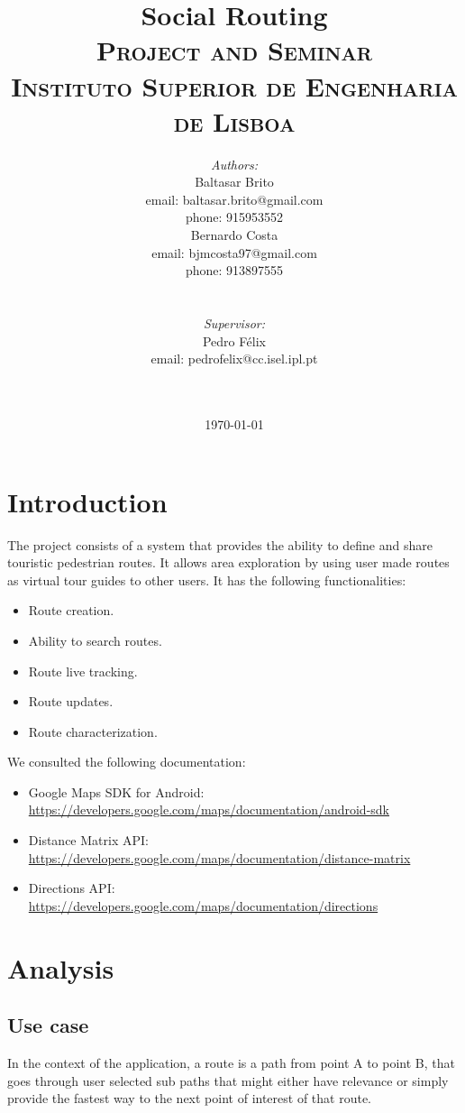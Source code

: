 \documentclass{article}
\title{
    \vspace{-4.0cm}
    {\Huge Social Routing}\\[0.5cm]    
    \textsc{\Large Project and Seminar}\\[0.5cm]
    \textsc{\large Instituto Superior de Engenharia de Lisboa}\\[0.5cm]
}
\date{\today}
\author{   
    \begin{minipage}{0.4\textwidth}
        \begin{flushleft} \large
        \emph{Authors:}\\
        Baltasar Brito\\
        {\small email: baltasar.brito@gmail.com}\\
        {\small phone: 915953552}\\
        Bernardo Costa\\
        {\small email: bjmcosta97@gmail.com}\\
        {\small phone: 913897555}\\
        \end{flushleft}
    \end{minipage}
    ~
    \begin{minipage}{0.4\textwidth}
        \begin{flushright} \large
        \emph{Supervisor:} \\ 
        Pedro Félix\\
        {\small email: pedrofelix@cc.isel.ipl.pt}\\  
        \end{flushright}
    \end{minipage}\\[2cm]  
}
\begin{document}
     
    
    \maketitle
 
    \section{Introduction} 

        The project consists of a system that provides the ability to define and share touristic pedestrian routes. It allows
        area exploration by using user made routes as virtual tour guides to other users. It has the following functionalities:
        \begin{itemize}
            \item Route creation.
            \item Ability to search routes.
            \item Route live tracking.
            \item Route updates.
            \item Route characterization.
        \end{itemize}

        \noindent
        We consulted the following documentation:

        \begin{itemize}
            \item Google Maps SDK for Android:\\
            \url{https://developers.google.com/maps/documentation/android-sdk}
            \item Distance Matrix API:\\
            \url{https://developers.google.com/maps/documentation/distance-matrix}
            \item Directions API:\\
            \url{https://developers.google.com/maps/documentation/directions}
        \end{itemize}

    \newpage
    

    \section{Analysis}

        \subsection{Use case}
            In the context of the application, a route is a path from point A to point B, that goes through user selected sub paths
            that might either have relevance or simply provide the fastest way to the next point of interest of that route. 
\end{document}
